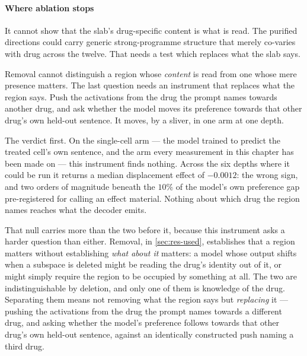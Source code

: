 \paragraph{Where ablation stops} It cannot show that the slab's drug-specific
content is what is read. The purified directions could carry generic
strong-programme structure that merely co-varies with drug across the twelve.
That needs a test which replaces what the slab says.



\begin{question}[3]
Removal cannot distinguish a region whose \emph{content} is read from one whose
mere presence matters. The last question needs an instrument that replaces what
the region says. Push the activations from the drug the prompt names towards
another drug, and ask whether the model moves its preference towards that other
drug's own held-out sentence. It moves, by a sliver, in one arm at one depth. 
\end{question}

\noindent
The verdict first. On the single-cell arm --- the model trained to predict the
treated cell's own sentence, and the arm every measurement in this chapter has
been made on --- this instrument finds nothing. Across the six depths where it
could be run it returns a median displacement effect of $-0.0012$: the wrong
sign, and two orders of magnitude beneath the $10\%$ of the model's own
preference gap pre-registered for calling an effect material. Nothing about
which drug the region names reaches what the decoder emits.

That null carries more than the two before it, because this instrument asks a
harder question than either. Removal, in \cref{sec:res-used}, establishes that a
region matters without establishing \emph{what about it} matters: a model whose
output shifts when a subspace is deleted might be reading the drug's identity
out of it, or might simply require the region to be occupied by something at
all. The two are indistinguishable by deletion, and only one of them is
knowledge of the drug. Separating them means not removing what the region says
but \emph{replacing} it --- pushing the activations from the drug the prompt
names towards a different drug, and asking whether the model's preference
follows towards that other drug's own held-out sentence, against an identically
constructed push naming a third drug.


